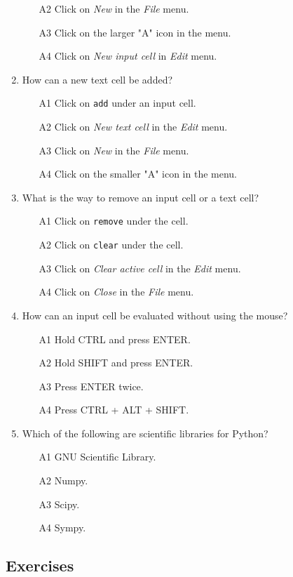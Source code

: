 \documentclass[article,A4,12pt]{llncs}
\begin{document}
\begin{enumerate}
\begin{enumerate}
\item[A2] Click on {\em New} in the {\em File} menu.
\item[A3] Click on the larger "A" icon in the menu.
\item[A4] Click on {\em New input cell} in {\em Edit} menu.
\end{enumerate}
\item How can a new text cell be added?
\begin{enumerate}
\item[A1] Click on {\tt add} under an input cell. 
\item[A2] Click on {\em New text cell} in the {\em Edit} menu.
\item[A3] Click on {\em New} in the {\em File} menu.
\item[A4] Click on the smaller "A" icon in the menu.
\end{enumerate}
\item What is the way to remove an input cell or a text cell?
\begin{enumerate}
\item[A1] Click on {\tt remove} under the cell. 
\item[A2] Click on {\tt clear} under the cell. 
\item[A3] Click on {\em Clear active cell} in the {\em Edit} menu.
\item[A4] Click on {\em Close} in the {\em File} menu.
\end{enumerate}
\item How can an input cell be evaluated without using the mouse?
\begin{enumerate}
\item[A1] Hold CTRL and press ENTER.
\item[A2] Hold SHIFT and press ENTER.
\item[A3] Press ENTER twice.
\item[A4] Press CTRL + ALT + SHIFT.
\end{enumerate}
\item Which of the following are scientific libraries for Python?
\begin{enumerate}
\item[A1] GNU Scientific Library.
\item[A2] Numpy.
\item[A3] Scipy.
\item[A4] Sympy.
\end{enumerate}
\end{enumerate}

\subsection{Exercises}
\end{document}
